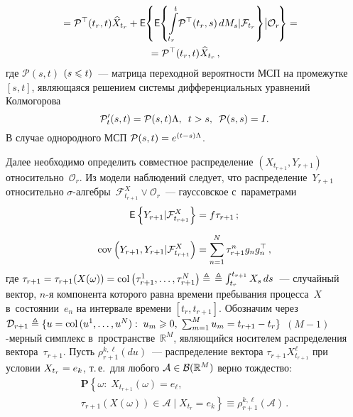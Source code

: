 \begin{multicols}{2}
\noindent
   \begin{multline}
 \hspace*{-11.66pt}{}=\mathcal{P}^{\top}(t_r,t)\widehat{X}_{t_r} + {\sf E}\hspace*{-2pt}
 \left\{{\sf E}\hspace*{-2pt}\left\{\int\limits_{t_r}^t\hspace*{-2pt}\mathcal{P}^{\top}(t_r,s)\,dM_s |
 {\mathcal{F}}_{t_r}\right\}\!\big\vert 
 \mathcal{O}_r\!\right\} ={}\hspace*{-4.24124pt}\\
 {}=
  \mathcal{P}^{\top}(t_r,t)\widehat{X}_{t_r}\,,
 \label{eq:bw_obs}
 \end{multline}
 где $\mathcal{P}(s,t)$ $(s \hm\leqslant t)$~--- матрица переходной ве\-ро\-ят\-ности МСП 
 на промежутке $[s,t]$, являющаяся решением сис\-те\-мы дифференциальных 
 уравнений Колмогорова
 \begin{equation*}
 \mathcal{P}'_t(s,t) = \mathcal{P}(s,t) \Lambda, \enskip t > s, \enskip \mathcal{P}(s,s) = I.
 \end{equation*}
 В случае однородного МСП $\mathcal{P}(s,t) \hm= e^{(t-s)\Lambda}$.
 
 Далее необходимо определить совместное распределение $(X_{t_{r+1}},Y_{r+1})$ 
 относительно~$ \mathcal{O}_r$. Из модели наблюдений следует, что 
 распределение~$Y_{r+1}$ относительно 
 $\sigma$-ал\-геб\-ры~$\mathcal{F}^X_{t_{r+1}} \vee \mathcal{O}_r$~---
 гауссовское с~параметрами 
 \begin{align*}
{\sf E}\left\{Y_{r+1}|{\mathcal{F}}^X_{t_{r+1}}\right\}& = f \tau_{r+1}\,; \\[6pt]
 \mathrm{cov} \left(Y_{r+1},Y_{r+1}|{\mathcal{F}}^X_{t_{r+1}}\right) &= 
 \displaystyle\sum\limits_{n=1}^N \tau_{r+1}^n g_ng_n^{\top}\,,
 \end{align*}
 где $\tau_{r+1} \hm= \tau_{r+1}(X(\omega))=
 \mathrm{col}\left(\tau_{r+1}^1,\ldots,\tau_{r+1}^N\right) \ebd$\linebreak
 $\triangleq 
 \int\nolimits_{t_r}^{t_{r+1}}X_s\,ds$~--- случайный вектор, $n$-я 
 компонента которого равна времени пребывания процесса~$X$ в~со\-сто\-янии~$e_n$ 
 на  интервале времени $[t_r, t_{r+1}]$. 
 Обозначим через $\mathcal{D}_{r+1} \ebd \{u=\mathrm{col}\,(u^1,\ldots,u^N):\; 
 u_m \hm\geqslant 0,\; \sum\nolimits_{m=1}^Mu_m\hm= t_{r+1}-t_r\}$ $(M-1)$-мер\-ный 
 симплекс в~пространстве~$\mathbb{R}^M$, являющийся носителем распределения 
 вектора~$\tau_{r+1}$. Пусть $\rho^{k,\ell}_{r+1}(du)$~--- 
 распределение вектора $\tau_{r+1} X_{t_{r+1}}^{\ell}$ при условии $X_{t_r}\hm=e_k$, 
 т.\,е.\ 
 для любого $\mathcal{A} \hm\in \mathcal{B}(\mathbb{R}^M)$ верно тождество:
\begin{multline*}
 \mathbf{P}\left\{\omega: \; X_{t_{r+1}}(\omega)=e_{\ell},\right.\\
 \left. 
 \tau_{r+1}(X(\omega)) \in \mathcal{A}\;|\;X_{t_r}=e_k\right\} \equiv
   \rho^{k,\ell}_{r+1}(\mathcal{A})\,.
\end{multline*}
 

\end{multicols}
